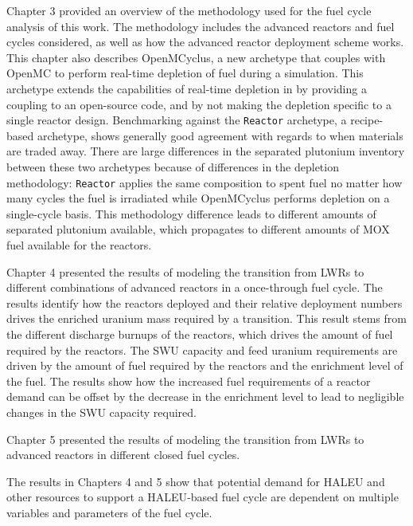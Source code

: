Chapter 3 provided an overview of the methodology used for the fuel 
cycle analysis of this work. The methodology includes the 
advanced reactors and fuel cycles considered, as well as how the 
advanced reactor deployment scheme works. This chapter also 
describes OpenMCyclus, a new archetype that couples \Cyclus with 
OpenMC to perform real-time depletion of fuel during a simulation. 
This archetype extends the capabilities of real-time depletion in 
\Cyclus by providing a coupling to an open-source code, and by 
not making the depletion specific to a single reactor design. 
Benchmarking against the \Cycamore \texttt{Reactor} archetype, 
a recipe-based archetype, shows generally good agreement with 
regards to when materials are traded away. There 
are large differences in the separated plutonium inventory between 
these two archetypes because of differences in the 
depletion methodology: \Cycamore \texttt{Reactor} applies the 
same composition to spent fuel no matter how many cycles the 
fuel is irradiated while OpenMCyclus performs depletion on a 
single-cycle basis. This methodology difference leads to different 
amounts of separated plutonium available, which propagates 
to different amounts of \gls{MOX} fuel available for the 
reactors. 

Chapter 4 presented the results of modeling the transition from 
\glspl{LWR} to different combinations of advanced reactors in 
a once-through fuel cycle. 
The results identify how 
the reactors deployed and their relative deployment numbers drives 
the enriched uranium mass required by a transition. This result stems 
from the different discharge burnups of the reactors, which drives the 
amount of fuel required by the reactors. The \gls{SWU} capacity and 
feed uranium requirements are driven by the amount of fuel required 
by the reactors and the enrichment level of the fuel. The results 
show how the increased fuel requirements of a reactor demand can 
be offset by the decrease in the enrichment level to lead to 
negligible changes in the \gls{SWU} capacity required. 

Chapter 5 presented the results of modeling the transition from 
\glspl{LWR} to advanced reactors in different closed fuel cycles. 

The results in Chapters 4 and 5 show that potential demand for 
\gls{HALEU} and other resources to support a \gls{HALEU}-based 
fuel cycle are dependent on multiple variables and parameters 
of the fuel cycle. 

